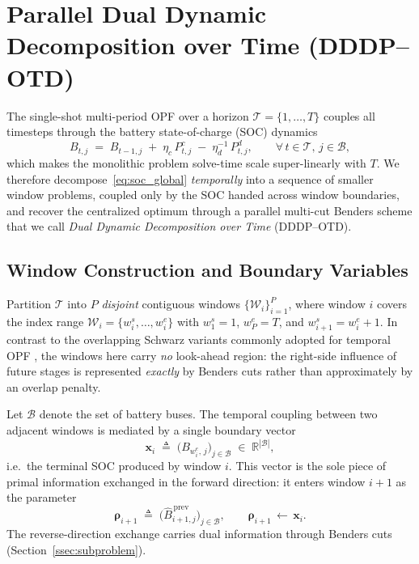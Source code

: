 
\section{Parallel Dual Dynamic Decomposition over Time (DDDP--OTD)}
\label{sec:dddp_otd}

The single-shot multi-period OPF over a horizon
$\mathcal{T}=\{1,\dots,T\}$ couples all timesteps through the battery
state-of-charge (SOC) dynamics
\begin{equation}
\label{eq:soc_global}
B_{t,j} \;=\; B_{t-1,j}\;+\;\eta_c\,P^{c}_{t,j}\;-\;\eta_d^{-1}\,P^{d}_{t,j},
\qquad \forall\,t\!\in\!\mathcal{T},\,j\!\in\!\mathcal{B},
\end{equation}
which makes the monolithic problem solve-time scale super-linearly with
$T$. We therefore decompose~\eqref{eq:soc_global} \emph{temporally} into a
sequence of smaller window problems, coupled only by the SOC handed
across window boundaries, and recover the centralized optimum through a
parallel multi-cut Benders scheme that we call \emph{Dual Dynamic
Decomposition over Time} (DDDP--OTD).

\subsection{Window Construction and Boundary Variables}
\label{ssec:windows}

Partition $\mathcal{T}$ into $P$ \emph{disjoint} contiguous windows
$\{\mathcal{W}_i\}_{i=1}^{P}$, where window $i$ covers the index range
$\mathcal{W}_i = \{w^{s}_i,\dots,w^{e}_i\}$ with
$w^{s}_1 = 1$, $w^{e}_P = T$, and
$w^{s}_{i+1} = w^{e}_i + 1$. In contrast to the overlapping Schwarz
variants commonly adopted for temporal OPF \cite{XX}, the windows here
carry \emph{no} look-ahead region: the right-side influence of future
stages is represented \emph{exactly} by Benders cuts rather than
approximately by an overlap penalty.

Let $\mathcal{B}$ denote the set of battery buses. The temporal
coupling between two adjacent windows is mediated by a single boundary
vector
\begin{equation}
\label{eq:bnd_def}
\bm{x}_i \;\triangleq\; \big(B_{w^{e}_i,\,j}\big)_{j\in\mathcal{B}}
\;\in\;\mathbb{R}^{|\mathcal{B}|},
\end{equation}
i.e.\ the terminal SOC produced by window $i$. This vector is the sole
piece of primal information exchanged in the forward direction: it
enters window $i{+}1$ as the parameter
\begin{equation}
\bm{\rho}_{i+1} \;\triangleq\; \big(\widehat{B}^{\,\text{prev}}_{i+1,j}\big)_{j\in\mathcal{B}},
\qquad
\bm{\rho}_{i+1} \,\leftarrow\, \bm{x}_i.
\end{equation}
The reverse-direction exchange carries dual information through Benders
cuts (Section~\ref{ssec:subproblem}).

